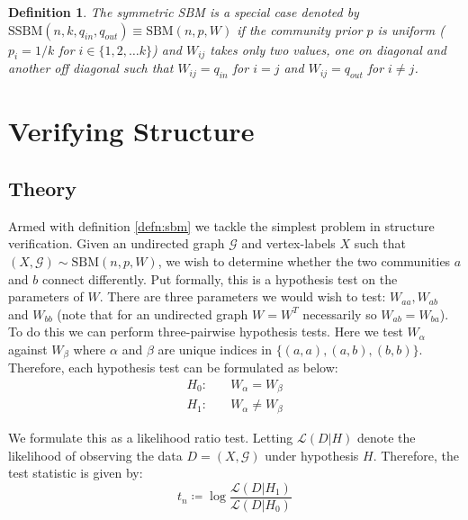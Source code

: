 \documentclass[]{article}
\newcommand{\Gcal}{\mathcal{G}}
\newcommand{\lik}{\mathcal{L}}
\newtheorem{definition}{Definition}[section]
\begin{document}
\begin{multicols*}{2}
\begin{definition}
	\label{defn:sym-sbm}
	The symmetric SBM is a special case denoted by $\textrm{SSBM}(n, k, q_{in}, q_{out}) \equiv \textrm{SBM}(n, p, W)$ if the community prior $p$ is uniform ($p_i = 1/k$ for $i \in \{1, 2, \dots k\}$) and $W_{ij}$ takes only two values, one on diagonal and another off diagonal such that $W_{ij} = q_{in}$ for $i=j$ and $W_{ij} = q_{out}$ for $i \neq j$.
\end{definition}

\section{Verifying Structure}
\subsection{Theory}

Armed with definition \ref{defn:sbm} we tackle the simplest problem in structure verification. Given an undirected graph $\Gcal$ and vertex-labels $X$ such that $(X, \Gcal) \sim \textrm{SBM}(n, p, W)$, we wish to determine whether the two communities $a$ and $b$ connect differently. Put formally, this is a hypothesis test on the parameters of $W$. There are three parameters we would wish to test: $W_{aa}, W_{ab}$ and $W_{bb}$ (note that for an undirected graph $W = W^T$ necessarily so $W_{ab} = W_{ba}$). To do this we can perform three-pairwise hypothesis tests. Here we test $W_{\alpha}$ against $W_{\beta}$ where $\alpha$ and $\beta$ are unique indices in $\{(a,a), (a, b), (b,b)\}$. Therefore, each hypothesis test can be formulated as below:
%
\begin{equation}
\begin{aligned}
	H_0:& \quad W_{\alpha} = W_{\beta} \\
	H_1:& \quad W_{\alpha} \neq W_{\beta}
\end{aligned}
\end{equation}

We formulate this as a likelihood ratio test. Letting $\lik(D | H)$ denote the likelihood of observing the data $D = (X, \Gcal)$ under hypothesis $H$. Therefore, the test statistic is given by:
%
\begin{equation}
	t_n \coloneqq \log \frac{\lik(D | H_1)}{\lik(D | H_0)}
	\label{eqn:test-statistic-start}
\end{equation}


\end{multicols*}
\end{document}
